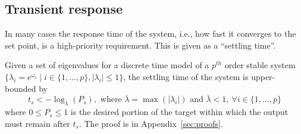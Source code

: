 \documentclass[a4paper,UKenglish]{lipics-v2018}
\newcommand{\mat}[1]{{#1}}
\renewcommand{\vec}[1]{{#1}}
\begin{document}

\subsection{Transient response} 
\label{sec:transientspecification}

In many cases the response time of the system, i.e., how fast it converges
to the set point, is a high-priority requirement.  This is given as a
``settling time''.
 
\begin{theorem}
%
Given a set of eigenvalues for a discrete time model of a $p^{th}$ order
stable system $\{\lambda_i =e^{\omega_i} \mid i \in \{1, \ldots,p\},
|\lambda_i| \leq 1 \}$, the settling time of the system is upper-bounded by
%
\begin{equation}
%
t_s<-\log_{\overline{\lambda}}({P_s}), \text{ where }
  \overline{\lambda} = \max(|\lambda_i|) \text{ and }
  \overline{\lambda}<1,\ \forall i \in \{1, \ldots,p\}
%
\label{eq:set_time}
\end{equation}
%
where $0\leq P_s \leq 1$ is the desired portion of the target within which
the output must remain after $t_s$.  The proof is in
Appendix~\ref{sec:proofs}.
%
\end{theorem}
\end{document}
